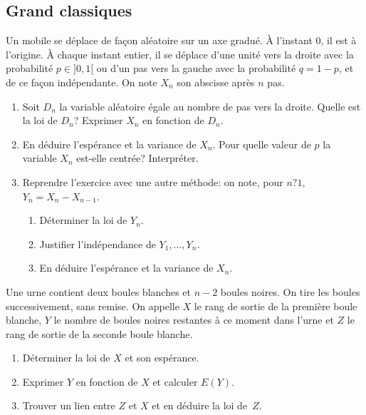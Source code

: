 \documentclass{book}
\begin{document}
\subsection*{Grand classiques}
\begin{Exercice}
Un mobile se déplace de façon aléatoire sur un axe gradué.
À l'instant $0$, il est à l'origine.
À chaque instant entier, il se déplace d'une unité vers la droite avec la probabilité $p\in ]0,1[$
ou d'un pas vers la gauche avec la probabilité $q=1-p$,
et de ce façon indépendante.
On note $X_n$ son abscisse après $n$ pas.
\begin{enumerate}
\item
  Soit $D_n$ la variable aléatoire égale au nombre de pas vers la droite.
  Quelle est la loi de $D_n$? Exprimer $X_n$ en fonction de $D_n$.
\item
  En déduire l'espérance et la variance de $X_n$.
  Pour quelle valeur de $p$ la variable $X_n$ est-elle centrée?
  Interpréter.
\item
  Reprendre l'exercice avec une autre méthode:
  on note, pour $n?1$, $Y_n = X_n - X_{n-1}$.

  \begin{enumerate}
  \item
    Déterminer la loi de $Y_n$.
  \item
    Justifier l'indépendance de $Y_1, \dots, Y_n$.
  \item
    En déduire l'espérance et la variance de $X_n$.
  \end{enumerate}
\end{enumerate}
\end{Exercice}

\begin{Exercice}

Une urne contient deux boules blanches et $n-2$ boules noires.
On tire les boules successivement, sans remise.
On appelle $X$ le rang de sortie de la première boule blanche,
$Y$ le nombre de boules noires restantes à ce moment dans l'urne
et $Z$ le rang de sortie de la seconde boule blanche.
\begin{enumerate}
\item
  Déterminer la loi de $X$ et son espérance.
\item
  Exprimer $Y$ en fonction de $X$ et calculer $E(Y)$.
\item
  Trouver un lien entre $Z$ et $X$ et en déduire la loi de~$Z$.
\end{enumerate}
\end{Exercice}
\end{document}
